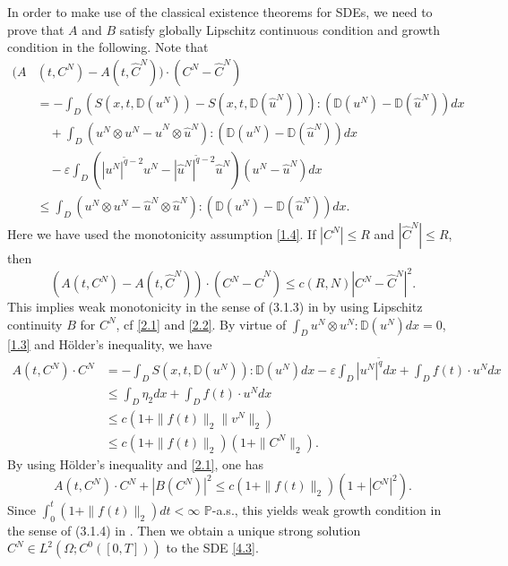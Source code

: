 \documentclass[reqno]{amsart}
\theoremstyle{definition}
\theoremstyle{remark}
\numberwithin{equation}{section} \allowdisplaybreaks
\begin{document}
In order to make use of the classical existence theorems for SDEs,
we need to prove that $A$ and $B$ satisfy globally Lipschitz
continuous condition and growth condition in the following. Note
that
\begin{equation*}
\begin{split}
(A&(t,C^N)-A(t,\hat{C}^N))\cdot(C^N-\hat{C}^N)\\
&=-\int_{D}(S(x,t,\mathbb{D}(u^N))-S(x,t,\mathbb{D}(\hat{u}^N))):(\mathbb{D}(u^N)-\mathbb{D}(\hat{u}^N))dx\\
&\quad+\int_{D}(u^N\otimes u^N-\hat{u}^N\otimes \hat{u}^N):(\mathbb{D}(u^N)-\mathbb{D}(\hat{u}^N))dx\\
&\quad-\varepsilon\int_{D}(|u^N|^{\tilde{q}-2}u^N-|\hat{u}^N|^{\tilde{q}-2}\hat{u}^N)(u^N-\hat{u}^N)dx\\
&\leq\int_{D}(u^N\otimes u^N-\hat{u}^N\otimes
\hat{u}^N):(\mathbb{D}(u^N)-\mathbb{D}(\hat{u}^N))dx.
\end{split}
\end{equation*}
Here we have used the monotonicity assumption \eqref{1.4}. If
$|C^N|\leq R$ and $|\hat{C}^N|\leq R$, then
$$(A(t,C^N)-A(t,\hat{C}^N))\cdot(C^N-\hat{C}^N)\leq c(R,N)|C^N-\hat{C}^N|^2.$$
This implies weak monotonicity in the sense of (3.1.3) in
\cite{CPMR} by using Lipschitz continuity $B$ for $C^N$, cf
\eqref{2.1} and \eqref{2.2}. By virtue of $\int_{D}u^N\otimes u^N:
\mathbb{D}(u^N)dx=0$, \eqref{1.3} and H\"{o}lder's inequality, we
have
\begin{align*}
A(t,C^N)\cdot C^N&=-\int_{D}S(x,t,\mathbb{D}(u^N)):\mathbb{D}(u^N)dx
-\varepsilon\int_{D}|u^N|^{\tilde{q}}dx+\int_{D}f(t)\cdot u^N dx\\
&\leq\int_{D}\eta_2 dx+\int_{D}f(t)\cdot u^N dx\\
&\leq c(1+\|f(t)\|_2\|v^N\|_2)\\
&\leq c(1+\|f(t)\|_2)(1+\|C^N\|_2).
\end{align*}
By using H\"{o}lder's inequality and \eqref{2.1}, one has
$$A(t,C^N)\cdot C^N+|B(C^N)|^2\leq c(1+\|f(t)\|_2)(1+|C^N|^2).$$
Since $\int_0^t(1+\|f(t)\|_2)dt<\infty$ $\mathbb{P}$-a.s., this
yields weak growth condition in the sense of (3.1.4) in \cite{CPMR}.
Then we obtain a unique strong solution $C^N\in
L^2(\Omega;C^0([0,T]))$ to the SDE \eqref{4.3}.
\end{document}
